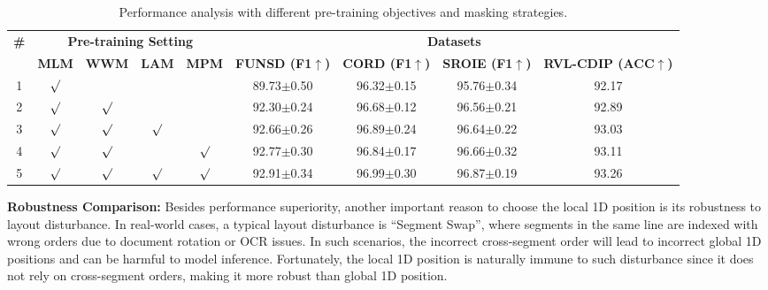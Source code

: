 \documentclass[11pt]{article}
\begin{document}
\begin{table*}[]
\centering
\small
\begin{tabular}{c|cccc|cccc}
\hline
\multirow{2}{*}{\textbf{\#}} & \multicolumn{4}{c|}{\textbf{Pre-training Setting}}        & \multicolumn{4}{c}{\textbf{Datasets}}                                 \\ \cline{2-9} 
                             & \textbf{MLM} & \textbf{WWM} & \textbf{LAM} & \textbf{MPM} & \textbf{FUNSD (F1$\uparrow$)} & \textbf{CORD (F1$\uparrow$)} & \textbf{SROIE (F1$\uparrow$)}  & \textbf{RVL-CDIP (ACC$\uparrow$)} \\ \hline
1                            &       $\surd$       &              &              &              & 89.73$\pm$0.50       & 96.32$\pm$0.15    & 95.76$\pm$0.34     & 92.17              \\
2                            &         $\surd$      &        $\surd$       &              &              & 92.30$\pm$0.24      & 96.68$\pm$0.12    & 96.56$\pm$0.21     & 92.89              \\
3                            &          $\surd$     &    $\surd$           &     $\surd$          &              & 92.66$\pm$0.26      & 96.89$\pm$0.24    & 96.64$\pm$0.22     & 93.03              \\
4                            &       $\surd$        &          $\surd$     &          &       $\surd$        & 92.77$\pm$0.30      & 96.84$\pm$0.17    & 96.66$\pm$0.32     & 93.11              \\ 
5                            &       $\surd$        &          $\surd$     &     $\surd$          &       $\surd$        & 92.91$\pm$0.34      & 96.99$\pm$0.30    & 96.87$\pm$0.19     & 93.26              \\ \hline
\end{tabular}
\caption{\label{table:ablation-on-tasks}
Performance analysis with different pre-training objectives and masking strategies.
}
\end{table*}



\noindent\textbf{Robustness Comparison:}
Besides performance superiority, another important reason to choose the local 1D position is its robustness to layout disturbance.
In real-world cases, a typical layout disturbance is ``Segment Swap'', where segments in the same line are indexed with wrong orders due to document rotation or OCR issues.
In such scenarios, the incorrect cross-segment order will lead to incorrect global 1D positions and can be harmful to model inference. Fortunately, the local 1D position is naturally immune to such disturbance since it does not rely on cross-segment orders, making it more robust than global 1D position.
\end{document}
